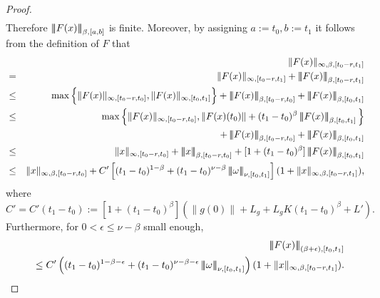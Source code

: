 \documentclass[graybox]{svmult}
\newcommand{\ltn}{\ensuremath{\left| \! \left| \! \left|}}
\newcommand{\rtn}{\ensuremath{\right| \! \right| \! \right|}}
\begin{document}
\begin{proof}
\begin{eqnarray}
	\end{eqnarray}
	Therefore $\ltn F(x)\rtn_{\beta,[a,b]}$ is finite.
	Moreover, by assigning $a:=t_0, b:= t_1$ it follows from the definition of $F$ that
	\begin{eqnarray}\label{F1}
	&& \| F(x)\|_{\infty,\beta,[t_0-r,t_1]}\notag\\
	&=& \|F(x)\|_{\infty,[t_0-r,t_1]}+\ltn F(x)\rtn_{\beta,[t_0-r,t_1]}\notag\\
	&\leq & \max\Big\{\|F(x)\|_{\infty,[t_0-r,t_0]},\|F(x)\|_{\infty,[t_0,t_1]} \Big\}+\ltn F(x)\rtn_{\beta,[t_0-r,t_0]} +\ltn F(x)\rtn_{\beta,[t_0,t_1]}\notag\\
	&\leq&\max\Big\{\|F(x)\|_{\infty,[t_0-r,t_0]},\|F(x)(t_0)\|+ (t_1-t_0)^\beta\ltn F(x)\rtn_{\beta,[t_0,t_1]}\Big\}\notag\\
	&&+\ltn F(x)\rtn_{\beta,[t_0-r,t_0]} +\ltn F(x)\rtn_{\beta,[t_0,t_1]}\notag\\
	&\leq &  \| x\|_{\infty,[t_0-r,t_0]}+ \ltn x\rtn_{\beta,[t_0-r,t_0]}+ [1+(t_1-t_0)^\beta]\ltn F(x)\rtn_{\beta,[t_0,t_1]}\notag\\
	&\leq & \| x\|_{\infty,\beta,[t_0-r,t_0]} + C'\left[(t_1-t_0)^{1-\beta} + (t_1-t_0)^{\nu-\beta} \ltn \omega\rtn_{\nu,[t_0,t_1]} \right](1+\|x\|_{\infty,\beta,[t_0-r,t_1]}),\notag\\
	\end{eqnarray}
	where 
	\begin{equation}\label{eqC}
	C'= C'(t_1-t_0) := [1+(t_1-t_0)^\beta](\|g(0)\|+ L_g + L_g K (t_1-t_0)^\beta+ L').
	\end{equation}
	Furthermore, for $0<\epsilon\leq \nu-\beta$ small enough, 
	\begin{eqnarray}\label{F2}
	&&\ltn F(x)\rtn_{(\beta+\epsilon),[t_0,t_1]}\notag\\
	&&\leq  C'\left((t_1-t_0)^{1-\beta-\epsilon} + (t_1-t_0)^{\nu-\beta-\epsilon} \ltn \omega\rtn_{\nu,[t_0,t_1]} \right)(1+\|x\|_{\infty,\beta,[t_0-r,t_1]}).
	\end{eqnarray}
	

\end{proof}
\end{document}
